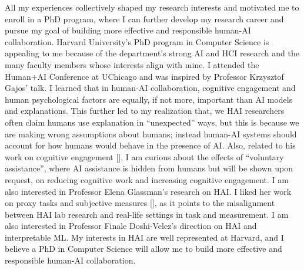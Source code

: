 
All my experiences collectively shaped my research interests and motivated me to enroll in a PhD program, where I can further develop my research career and pursue my goal of building more effective and responsible human-AI collaboration. 
Harvard University's PhD program in Computer Science is appealing to me because of the department's strong AI and HCI research and the many faculty members whose interests align with mine. 
I attended the Human+AI Conference at UChicago and was inspired by Professor Krzysztof Gajos' talk. I learned that in human-AI collaboration, cognitive engagement and human psychological factors are equally, if not more, important than AI models and explanations. This further led to my realization that, we HAI researchers often claim humans use explanation in “unexpected” ways, but this is because we are making wrong assumptions about humans; instead human-AI systems should account for how humans would behave in the presence of AI. Also, related to his work on cognitive engagement [], I am curious about the effects of “voluntary assistance”, where AI assistance is hidden from humans but will be shown upon request, on reducing cognitive work and increasing cognitive engagement. 
I am also interested in Professor Elena Glassman’s research on HAI. I liked her work on proxy tasks and subjective measures [], as it points to the misalignment between HAI lab research and real-life settings in task and measurement. 
I am also interested in Professor Finale Doshi-Velez’s direction on HAI and interpretable ML. 
My interests in HAI are well represented at Harvard, and I believe a PhD in Computer Science will allow me to build more effective and responsible human-AI collaboration.